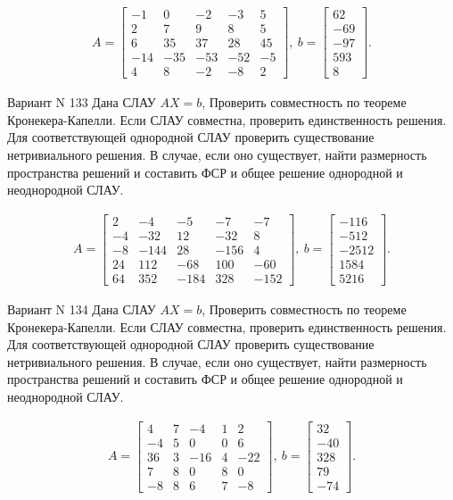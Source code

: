 \documentclass[11pt]{report}
\begin{document}
\begin{align*}
 A = \left[\begin{matrix}-1 & 0 & -2 & -3 & 5\\2 & 7 & 9 & 8 & 5\\6 & 35 & 37 & 28 & 45\\-14 & -35 & -53 & -52 & -5\\4 & 8 & -2 & -8 & 2\end{matrix}\right],
\ b = \left[\begin{matrix}62\\-69\\-97\\593\\8\end{matrix}\right]. 
 \end{align*}

Вариант N 133
Дана СЛАУ $AX = b$,
Проверить совместность по теореме Кронекера-Капелли. Если СЛАУ совместна, проверить единственность решения.
Для соответствующей однородной СЛАУ проверить существование нетривиального решения. В случае, если оно существует,
найти размерность пространства решений и составить ФСР и общее решение однородной  и неоднородной СЛАУ.


\begin{align*}
 A = \left[\begin{matrix}2 & -4 & -5 & -7 & -7\\-4 & -32 & 12 & -32 & 8\\-8 & -144 & 28 & -156 & 4\\24 & 112 & -68 & 100 & -60\\64 & 352 & -184 & 328 & -152\end{matrix}\right],
\ b = \left[\begin{matrix}-116\\-512\\-2512\\1584\\5216\end{matrix}\right]. 
 \end{align*}

Вариант N 134
Дана СЛАУ $AX = b$,
Проверить совместность по теореме Кронекера-Капелли. Если СЛАУ совместна, проверить единственность решения.
Для соответствующей однородной СЛАУ проверить существование нетривиального решения. В случае, если оно существует,
найти размерность пространства решений и составить ФСР и общее решение однородной  и неоднородной СЛАУ.


\begin{align*}
 A = \left[\begin{matrix}4 & 7 & -4 & 1 & 2\\-4 & 5 & 0 & 0 & 6\\36 & 3 & -16 & 4 & -22\\7 & 8 & 0 & 8 & 0\\-8 & 8 & 6 & 7 & -8\end{matrix}\right],
\ b = \left[\begin{matrix}32\\-40\\328\\79\\-74\end{matrix}\right]. 
 \end{align*}
\end{document}
